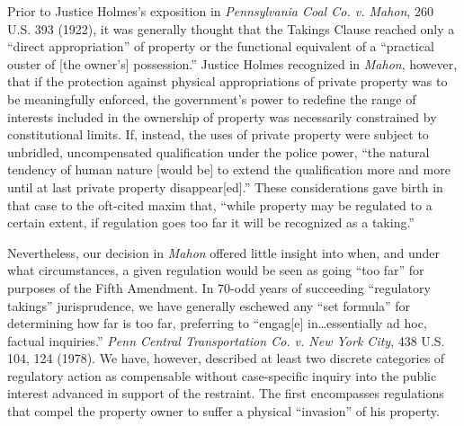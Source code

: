Prior to Justice Holmes's exposition in \textit{Pennsylvania Coal Co. v. Mahon},
260 U.S. 393 (1922), it was generally thought that the Takings Clause reached
only a ``direct appropriation'' of property
or the functional equivalent of a ``practical ouster of
[the owner's] possession.''
Justice Holmes recognized in \textit{Mahon}, however, that if the
protection against physical appropriations of private property was to be
meaningfully enforced, the government's power to redefine the range of interests
included in the ownership of property was necessarily constrained by
constitutional limits. If, instead, the uses of private property were subject to
unbridled, uncompensated qualification under the police power, ``the natural
tendency of human nature [would be] to extend the qualification more and more
until at last private property disappear[ed].'' These considerations gave birth
in that case to the oft-cited maxim that, ``while property may be regulated to a
certain extent, if regulation goes too far it will be recognized as a taking.'' 

Nevertheless, our decision in \textit{Mahon} offered little insight into when,
and under what circumstances, a given regulation would be seen as going ``too
far'' for purposes of the Fifth Amendment. In 70-odd years of succeeding
``regulatory takings'' jurisprudence, we have generally eschewed any ``set
formula'' for determining how far is too far, preferring to ``engag[e]
in\ldots essentially ad hoc, factual inquiries.'' \textit{Penn Central
Transportation Co. v. New York City}, 438 U.S. 104, 124 (1978).
We have, however,
described at least two discrete categories of regulatory action as compensable
without case-specific inquiry into the public interest advanced in support of
the restraint. The first encompasses regulations that compel the property owner
to suffer a physical ``invasion'' of his property.

